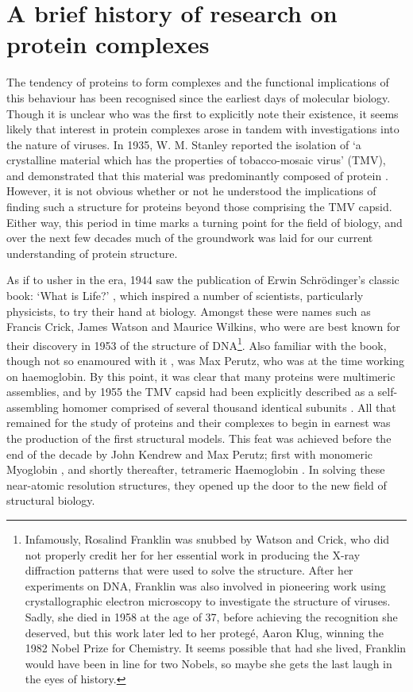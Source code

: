 \documentclass[a4paper,11pt,twoside,openright]{scrbook}
\begin{document}
\section{A brief history of research on protein complexes}
The tendency of proteins to form complexes and the functional implications of this behaviour has been recognised since the earliest days of molecular biology. Though it is unclear who was the first to explicitly note their existence, it seems likely that interest in protein complexes arose in tandem with investigations into the nature of viruses. In 1935, W. M. Stanley reported the isolation of `a crystalline material which has the properties of tobacco-mosaic virus' (TMV), and demonstrated that this material was predominantly composed of protein \cite{Stanley1935}. However, it is not obvious whether or not he understood the implications of finding such a structure for proteins beyond those comprising the TMV capsid. Either way, this period in time marks a turning point for the field of biology, and over the next few decades much of the groundwork was laid for our current understanding of protein structure.

As if to usher in the era, 1944 saw the publication of Erwin Schrödinger's classic book: `What is Life?' \cite{Schrodinger1947}, which inspired a number of scientists, particularly physicists, to try their hand at biology. Amongst these were names such as Francis Crick, James Watson and Maurice Wilkins, who were are best known for their discovery in 1953 of the structure of DNA\footnote{Infamously, Rosalind Franklin was snubbed by Watson and Crick, who did not properly credit her for her essential work in producing the X-ray diffraction patterns that were used to solve the structure. After her experiments on DNA, Franklin was also involved in pioneering work using crystallographic electron microscopy to investigate the structure of viruses. Sadly, she died in 1958 at the age of 37, before achieving the recognition she deserved, but this work later led to her protegé, Aaron Klug, winning the 1982 Nobel Prize for Chemistry. It seems possible that had she lived, Franklin would have been in line for two Nobels, so maybe she gets the last laugh in the eyes of history.}. Also familiar with the book, though not so enamoured with it \cite{Dronamraju1999}, was Max Perutz, who was at the time working on haemoglobin. By this point, it was clear that many proteins were multimeric assemblies, and by 1955 the TMV capsid had been explicitly described as a self-assembling homomer comprised of several thousand identical subunits \cite{Fraenkel-Conrat1955}. All that remained for the study of proteins and their complexes to begin in earnest was the production of the first structural models. This feat was achieved before the end of the decade by John Kendrew and Max Perutz; first with monomeric Myoglobin \cite{Kendrew1958}, and shortly thereafter, tetrameric Haemoglobin \cite{Perutz1960}. In solving these near-atomic resolution structures, they opened up the door to the new field of structural biology.
\end{document}
